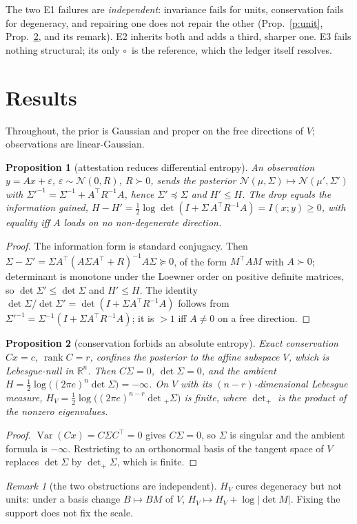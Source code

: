 \documentclass[11pt]{article}
\theoremstyle{definition}\newtheorem{definition}{Definition}
\theoremstyle{plain}\newtheorem{proposition}{Proposition}
\theoremstyle{remark}\newtheorem{remark}{Remark}
\newcommand{\st}{x}                  %
\newcommand{\obs}{y}                 %
\newcommand{\Amap}{A}                %
\newcommand{\Rcov}{R}                %
\newcommand{\mean}{\mu}
\newcommand{\cov}{\Sigma}
\newcommand{\Vsub}{V}                %
\newcommand{\Ent}{H}                 %
\newcommand{\Ncal}{\mathcal{N}}
\newcommand{\hf}{\ensuremath{\circ}}
\begin{document}
\medskip
\noindent The two E1 failures are \emph{independent}: invariance fails for units, conservation
fails for degeneracy, and repairing one does not repair the other (Prop.~\ref{p:unit},
Prop.~\ref{p:cons}, and its remark). E2 inherits both and adds a third, sharper one. E3 fails
nothing structural; its only \hf\ is the reference, which the ledger itself resolves.

\section{Results}
Throughout, the prior is Gaussian and proper on the free directions of $\Vsub$; observations
are linear-Gaussian.

\begin{proposition}[attestation reduces differential entropy]\label{p:attest}
An observation $\obs=\Amap\st+\varepsilon$, $\varepsilon\sim\Ncal(0,\Rcov)$, $\Rcov\succ0$, sends
the posterior $\Ncal(\mean,\cov)\mapsto\Ncal(\mean',\cov')$ with
$\cov'^{-1}=\cov^{-1}+\Amap^{\!\top}\Rcov^{-1}\Amap$, hence $\cov'\preceq\cov$ and
$\Ent'\le\Ent$. The drop equals the information gained,
$\Ent-\Ent'=\tfrac12\log\det(I+\cov\,\Amap^{\!\top}\Rcov^{-1}\Amap)=I(\st;\obs)\ge0$, with
equality iff $\Amap$ loads on no non-degenerate direction.
\end{proposition}
\begin{proof}
The information form is standard conjugacy. Then
$\cov-\cov'=\cov\Amap^{\!\top}(\Amap\cov\Amap^{\!\top}+\Rcov)^{-1}\Amap\cov\succeq0$, of the form
$M^{\!\top}\!AM$ with $A\succ0$; determinant is monotone under the Loewner order on positive
definite matrices, so $\det\cov'\le\det\cov$ and $\Ent'\le\Ent$. The identity
$\det\cov/\det\cov'=\det(I+\cov\Amap^{\!\top}\Rcov^{-1}\Amap)$ follows from
$\cov'^{-1}=\cov^{-1}(I+\cov\Amap^{\!\top}\Rcov^{-1}\Amap)$; it is $>1$ iff $\Amap\ne0$ on a
free direction.
\end{proof}

\begin{proposition}[conservation forbids an absolute entropy]\label{p:cons}
Exact conservation $C\st=c$, $\operatorname{rank}C=r$, confines the posterior to the affine
subspace $\Vsub$, which is Lebesgue-null in $\mathbb{R}^n$. Then $C\cov=0$, $\det\cov=0$, and the
ambient $\Ent=\tfrac12\log\big((2\pi e)^n\det\cov\big)=-\infty$. On $\Vsub$ with its
$(n-r)$-dimensional Lebesgue measure, $\Ent_{\Vsub}=\tfrac12\log\big((2\pi e)^{n-r}\det{}_{+}\cov\big)$
is finite, where $\det_{+}$ is the product of the nonzero eigenvalues.
\end{proposition}
\begin{proof}
$\operatorname{Var}(C\st)=C\cov C^{\!\top}=0$ gives $C\cov=0$, so $\cov$ is singular and the ambient
formula is $-\infty$. Restricting to an orthonormal basis of the tangent space of $\Vsub$
replaces $\det\cov$ by $\det_{+}\cov$, which is finite.
\end{proof}
\begin{remark}[the two obstructions are independent]
$\Ent_{\Vsub}$ cures degeneracy but not units: under a basis change $B\mapsto BM$ of $\Vsub$,
$\Ent_{\Vsub}\mapsto\Ent_{\Vsub}+\log|\det M|$. Fixing the support does not fix the scale.
\end{remark}
\end{document}
